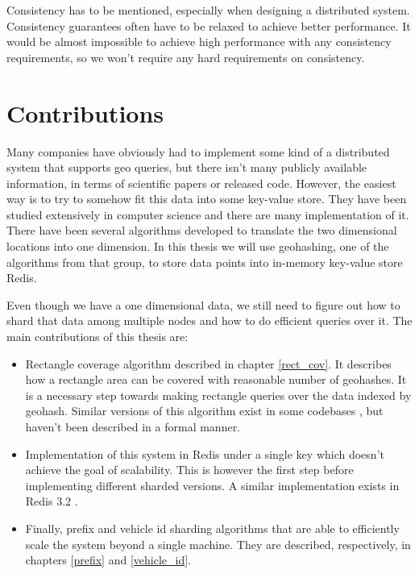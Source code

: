 \documentclass[times, utf8, diplomski]{fer}
\begin{document}
Consistency has to be mentioned, especially when designing a distributed system. Consistency guarantees often have to be relaxed to achieve better performance. It would be almost impossible to achieve high performance with any consistency requirements, so we won't require any hard requirements on consistency.

\section {Contributions}
Many companies have obviously had to implement some kind of a distributed system that supports geo queries, but there isn't many publicly available information, in terms of scientific papers or released code. However, the easiest way is to try to somehow fit this data into some key-value store. They have been studied extensively in computer science and there are many implementation of it. There have been several algorithms developed to translate the two dimensional locations into one dimension. In this thesis we will use geohashing, one of the algorithms from that group, to store data points into in-memory key-value store Redis.

Even though we have a one dimensional data, we still need to figure out how to shard that data among multiple nodes and how to do efficient queries over it. The main contributions of this thesis are:
\begin{itemize}
\item Rectangle coverage algorithm described in chapter \ref{rect_cov}. It describes how a rectangle area can be covered with reasonable number of geohashes. It is a necessary step towards making rectangle queries over the data indexed by geohash. Similar versions of this algorithm exist in some codebases \citet{davidmoten}, but haven't been described in a formal manner.

\item Implementation of this system in Redis under a single key which doesn't achieve the goal of scalability. This is however the first step before implementing different sharded versions. A similar implementation exists in Redis 3.2 \cite{redis_geo}.

\item Finally, prefix and vehicle id sharding algorithms that are able to efficiently scale the system beyond a single machine. They are described, respectively, in chapters \ref{prefix} and \ref{vehicle_id}.
\end{itemize} 
\end{document}
